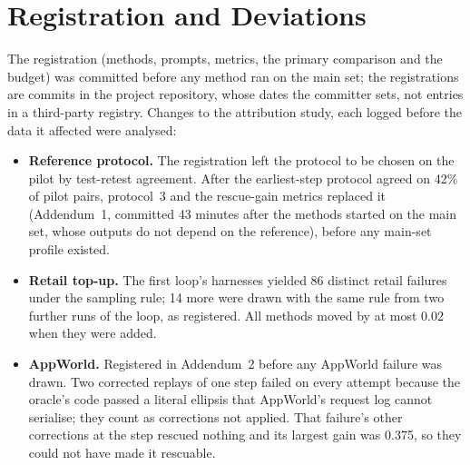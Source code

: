 \documentclass[11pt]{article}
\begin{document}
\section{Registration and Deviations}
\label{app:prereg}

The registration (methods, prompts, metrics, the primary comparison and the budget) was committed before any method ran on the main set; the registrations are commits in the project repository, whose dates the committer sets, not entries in a third-party registry. Changes to the attribution study, each logged before the data it affected were analysed:
\begin{itemize}
\setlength\itemsep{0pt}
\item \textbf{Reference protocol.} The registration left the protocol to be chosen on the pilot by test-retest agreement. After the earliest-step protocol agreed on 42\% of pilot pairs, protocol~3 and the rescue-gain metrics replaced it (Addendum~1, committed 43 minutes after the methods started on the main set, whose outputs do not depend on the reference), before any main-set profile existed.
\item \textbf{Retail top-up.} The first loop's harnesses yielded 86 distinct retail failures under the sampling rule; 14 more were drawn with the same rule from two further runs of the loop, as registered. All methods moved by at most 0.02 when they were added.
\item \textbf{AppWorld.} Registered in Addendum~2 before any AppWorld failure was drawn. Two corrected replays of one step failed on every attempt because the oracle's code passed a literal ellipsis that AppWorld's request log cannot serialise; they count as corrections not applied. That failure's other corrections at the step rescued nothing and its largest gain was 0.375, so they could not have made it rescuable.
\end{itemize}
\end{document}
